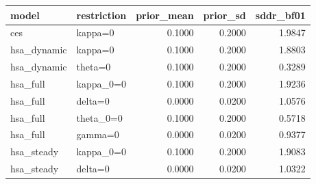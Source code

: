 \begin{tabular}{llrrr}
\toprule
model & restriction & prior\_mean & prior\_sd & sddr\_bf01 \\
\midrule
ces & kappa=0 & 0.1000 & 0.2000 & 1.9847 \\
hsa\_dynamic & kappa=0 & 0.1000 & 0.2000 & 1.8803 \\
hsa\_dynamic & theta=0 & 0.1000 & 0.2000 & 0.3289 \\
hsa\_full & kappa\_0=0 & 0.1000 & 0.2000 & 1.9236 \\
hsa\_full & delta=0 & 0.0000 & 0.0200 & 1.0576 \\
hsa\_full & theta\_0=0 & 0.1000 & 0.2000 & 0.5718 \\
hsa\_full & gamma=0 & 0.0000 & 0.0200 & 0.9377 \\
hsa\_steady & kappa\_0=0 & 0.1000 & 0.2000 & 1.9083 \\
hsa\_steady & delta=0 & 0.0000 & 0.0200 & 1.0322 \\
\bottomrule
\end{tabular}
